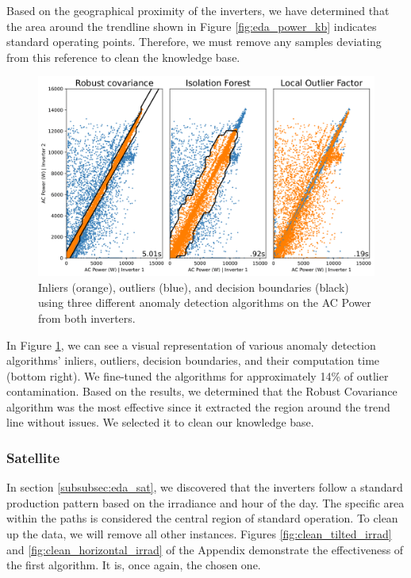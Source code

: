 Based on the geographical proximity of the inverters, we have determined that the area around the trendline shown in Figure \ref{fig:eda_power_kb} indicates standard operating points. Therefore, we must remove any samples deviating from this reference to clean the knowledge base.

\begin{figure}[h!]
    \centering
    \includegraphics[width=\textwidth]{figures/chapter5/cleaning/20_cleaning_power-1.png}
    \caption{Inliers (orange), outliers (blue), and decision boundaries (black) using three different anomaly detection algorithms on the AC Power from both inverters.}
    \label{fig:clean_power}
\end{figure}

In Figure \ref{fig:clean_power}, we can see a visual representation of various anomaly detection algorithms' inliers, outliers, decision boundaries, and their computation time (bottom right). We fine-tuned the algorithms for approximately 14\% of outlier contamination. Based on the results, we determined that the Robust Covariance algorithm was the most effective since it extracted the region around the trend line without issues. We selected it to clean our knowledge base.

\subsubsection{Satellite}

In section \ref{subsubsec:eda_sat}, we discovered that the inverters follow a standard production pattern based on the irradiance and hour of the day. The specific area within the paths is considered the central region of standard operation. To clean up the data, we will remove all other instances. Figures \ref{fig:clean_tilted_irrad} and \ref{fig:clean_horizontal_irrad} of the Appendix demonstrate the effectiveness of the first algorithm. It is, once again, the chosen one.

